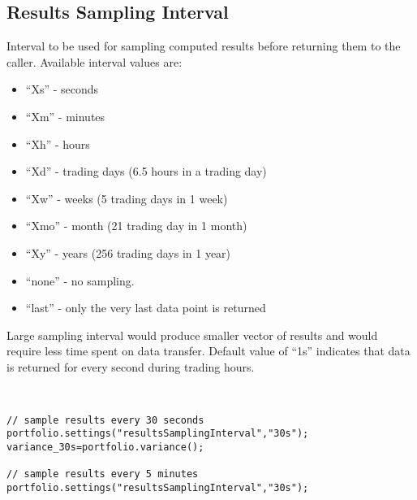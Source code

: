 \documentclass[letterpaper]{report}
\begin{document}
\subsection{Results Sampling Interval}
Interval to be used for sampling computed results before returning them to the caller. 
Available interval values are: 
  \begin{itemize} 
\item ``Xs'' - seconds
\item ``Xm'' - minutes
\item ``Xh'' - hours
\item ``Xd'' - trading days (6.5 hours in a trading day)
\item ``Xw'' - weeks (5 trading days in 1 week)
\item ``Xmo'' - month (21 trading day in 1 month)
\item ``Xy'' - years (256 trading days in 1 year)
\item ``none'' - no sampling.
\item ``last'' - only the very last data point is returned  
\end{itemize}
Large sampling interval would produce smaller vector of results and would require less time spent on data transfer. 
Default value of ``1s'' indicates that data is returned for every second during
trading hours.
\begin{lstlisting}


// sample results every 30 seconds
portfolio.settings("resultsSamplingInterval","30s");
variance_30s=portfolio.variance();

// sample results every 5 minutes
portfolio.settings("resultsSamplingInterval","30s");

\end{lstlisting}
\end{document}
